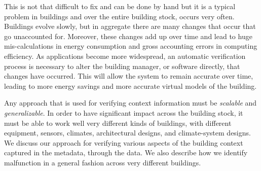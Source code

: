 This is not that difficult to fix and can be done by hand but it is a typical problem in buildings and over the entire building stock, 
occurs very often.  Buildings evolve slowly, but in aggregate there are many changes that occur that go unaccounted for.  Moreover, these
changes add up over time and lead to huge mis-calculations in energy consumption and gross accounting errors in computing efficiency.
As applications become more widespread, an automatic verification process is necessary to alter the building manager, or software directly,
that changes have occurred.  This will allow the system to remain accurate over time, leading to more energy savings and more accurate
virtual models of the building.

Any approach that is used for verifying context information must be \emph{scalable} and \emph{generalizable}.  In order to have 
significant impact across the building stock, it must be able to work well very different kinds of buildings, with different equipment,
sensors, climates, architectural designs, and climate-system designs.  We discuss our approach for verifying various aspects 
of the building context captured in the metadata, through the data.  We also describe how we identify malfunction in a general fashion
across very different buildings.










